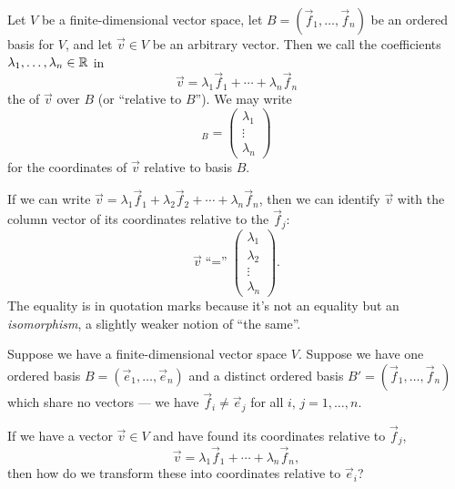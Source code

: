 \begin{definition}\label{defn:basis:coordinates}
Let $V$ be a finite-dimensional vector space, let
$B=(\vec{f}_{1},\dots,\vec{f}_{n})$ be an ordered basis for $V$, and let
$\vec{v}\in V$ be an arbitrary vector. Then we call the coefficients
$\lambda_{1},\dots,\lambda_{n}\in\mathbb{R}$ in
\begin{equation}
\vec{v} = \lambda_{1}\vec{f}_{1} + \cdots + \lambda_{n}\vec{f}_{n}
\end{equation}
the  of $\vec{v}$ over $B$ (or ``relative to $B$'').
We may write
\begin{equation}
[\vec{v}]_{B} = \begin{pmatrix}\lambda_{1}\\\vdots\\\lambda_{n}
\end{pmatrix}
\end{equation}
for the coordinates of $\vec{v}$ relative to basis $B$.
\end{definition}

\begin{remark}
If we can write $\vec{v} = \lambda_{1}\vec{f}_{1} + \lambda_{2}\vec{f}_{2} + \cdots + \lambda_{n}\vec{f}_{n}$,
then we can identify $\vec{v}$ with the column vector of its coordinates
relative to the $\vec{f}_{j}$:
\begin{equation}
  \vec{v} \mathrel{\mbox{``=''}}
  \begin{pmatrix}\lambda_{1}\\\lambda_{2}\\\vdots\\\lambda_{n}
  \end{pmatrix}.
\end{equation}
The equality is in quotation marks because it's not an equality but an \emph{isomorphism},
a slightly weaker notion of ``the same''.
\end{remark}

\begin{problem}
Suppose we have a finite-dimensional vector space $V$.
Suppose we have one ordered basis $B=(\vec{e}_{1},\dots,\vec{e}_{n})$
and a distinct ordered basis $B'=(\vec{f}_{1},\dots,\vec{f}_{n})$
which share no vectors --- we have $\vec{f}_{i}\neq\vec{e}_{j}$
for all $i$, $j=1,\dots,n$.

If we have a vector $\vec{v}\in V$ and have found its coordinates
relative to $\vec{f}_{j}$,
\begin{equation}
\vec{v} = \lambda_{1}\vec{f}_{1} + \cdots + \lambda_{n}\vec{f}_{n},
\end{equation}
then how do we transform these into coordinates relative to $\vec{e}_{i}$?
\end{problem}

